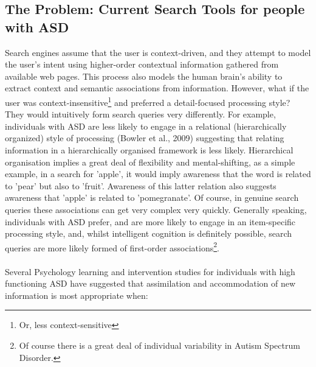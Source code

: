 \documentclass[11pt]{article}
\begin{document}
\subsection{The Problem: Current Search Tools for people with ASD}
Search engines assume that the user is context-driven, and they attempt to model the user's intent using higher-order contextual information gathered from available web pages. This process also models the human brain's ability to extract context and semantic associations from information. However, what if the user was context-insensitive\footnote{Or, less context-sensitive}  and preferred a detail-focused processing style? They would intuitively form search queries very differently. For example, individuals with ASD are less likely to engage in a relational (hierarchically organized) style of processing (Bowler et al., 2009) suggesting that relating information in a hierarchically organised framework is less likely. Hierarchical organisation implies a great deal of flexibility and mental-shifting, as a simple example, in a search for 'apple', it would imply awareness that the word is related to 'pear' but also to 'fruit'. Awareness of this latter relation also suggests awareness that 'apple' is related to 'pomegranate'. Of course, in genuine search queries these associations can get very complex very quickly. Generally speaking, individuals with ASD prefer, and are more likely to engage in an item-specific processing style, and, whilst intelligent cognition is definitely possible, search queries are more likely formed of first-order associations\footnote{Of course there is a great deal of individual variability in Autism Spectrum Disorder.}. \\
\\Several Psychology learning and intervention studies for individuals with high functioning ASD have suggested that assimilation and accommodation of new information is most appropriate when:\\
\end{document}
